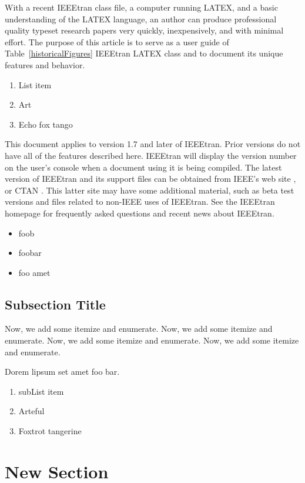 \documentclass[10pt,conference,compsocconf]{IEEEtran}
\begin{document}
With a recent IEEEtran class file, a computer running LATEX, and a basic
understanding of the LATEX language, an author can produce professional quality
typeset research papers very quickly, inexpensively, and with minimal effort.
The purpose of this article is to serve as a user guide of Table~\ref{historicalFigures}
IEEEtran LATEX class and to document its unique features and behavior.

\begin{enumerate}
\item List item
\item Art
\item Echo fox tango
\end{enumerate}

This document applies to version 1.7 and later of IEEEtran. Prior versions do
not have all of the features described here. IEEEtran will display the version
number on the user’s console when a document using it is being compiled. The
latest version of IEEEtran and its support files can be obtained from IEEE’s web
site \cite{Firstman:2014}, or CTAN \cite{Fubtutorial:2014}. This latter site may have some
additional material, such as beta test versions and files related to non-IEEE
uses of IEEEtran. See the IEEEtran homepage \cite{Bookman:2014} for frequently asked
questions and recent news about IEEEtran.

\begin{itemize}
\item foob
\item foobar
\item foo amet
\end{itemize}

\subsection{Subsection Title}
\label{subsectiontitle}

Now, we add some itemize and enumerate. Now, we add some itemize and enumerate.
Now, we add some itemize and enumerate. Now, we add some itemize and enumerate.

Dorem lipsum set amet foo bar.

\begin{enumerate}
\item subList item
\item Arteful
\item Foxtrot tangerine
\end{enumerate}

\section{New Section}
\label{newsection}
\end{document}
